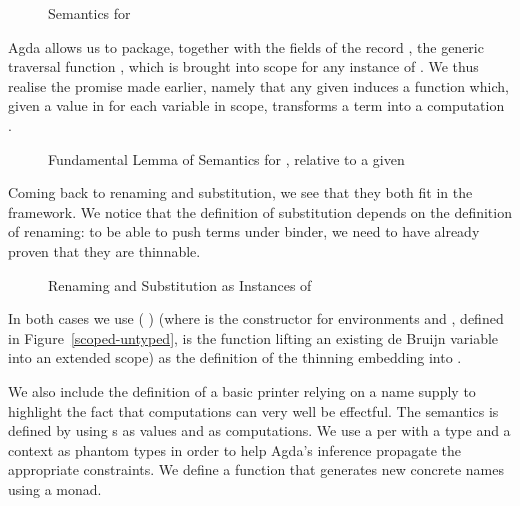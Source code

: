 \begin{figure}[h]
\caption{Semantics for }\label{figure:lamsem}
\end{figure}

Agda allows us to package, together with the fields of the record
, the generic traversal function , which is brought
into scope for any instance of . We thus realise the promise
made earlier, namely that any given { 
  } induces a function which, given a value in
 for each variable in scope, transforms a   term into a
computation .

\begin{figure}[h]
\caption{Fundamental Lemma of Semantics for , relative to a given \;\;}\label{figure:fdmlamsem}
\end{figure}

Coming back to renaming and substitution, we see that they both fit in the
 framework. We notice that the definition of substitution depends on
the definition of renaming: to be able to push terms under binder, we need to
have already proven that they are thinnable.

\begin{figure}[h]
\begin{minipage}{0.45\textwidth}
\end{minipage}
\begin{minipage}{0.45\textwidth}
\end{minipage}
\caption{Renaming and Substitution as Instances of }
\end{figure}

In both cases we use ( ) (where  is the constructor
for environments and , defined in Figure~\ref{scoped-untyped}, is the function
lifting an existing de Bruijn variable
into an extended scope) as the definition of the thinning embedding \AB{$\Gamma$}
into {\AB{$\sigma$} \AIC{::} \AB{$\Gamma$}}.

We also include the definition of a basic printer relying on a
name supply to highlight the fact that computations can very well be
effectful. The  semantics is defined by using s
as values and {  } as computations. We use a
per with a type and a context as phantom types in order to
help Agda's inference propagate the appropriate constraints.
We define a function  that generates new concrete names using a
 monad.

